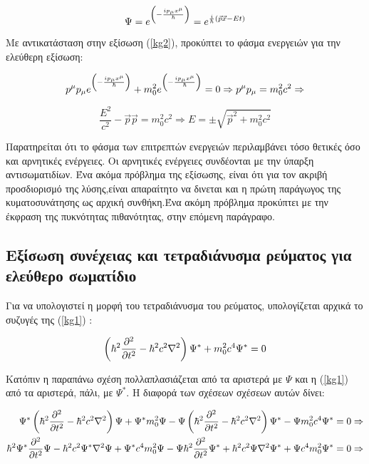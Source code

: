 \begin{equation}
  \Psi = e^{\left(  -\frac{ip_{\mu}x^{\mu}}{\hbar} \right)  } =e^{ \frac{i}{\hbar}\left(  \vec{p}\vec{x} -Et \right)  }
  \label{sol1}
\end{equation}

Με αντικατάσταση στην εξίσωση (\ref{kg2}), προκύπτει το φάσμα ενεργειών για την ελεύθερη εξίσωση:

\[
  {p}^\mu {p}_\mu e^{\left(  -\frac{ip_{\mu}x^{\mu}}{\hbar} \right)  } +m_0^2 e^{\left(  -\frac{ip_{\mu}x^{\mu}}{\hbar} \right)  } = 0 \Rightarrow {p}^\mu {p}_\mu = m_0^2 c^2 \Rightarrow
\]

\[
\frac{E^2}{c^2}- \vec{p}\vec{p}=m_0^2c^2 \Rightarrow E=\pm \sqrt{\vec{p}^2 + m_0^2c^2} 
\]

Παρατηρείται ότι το φάσμα των επιτρεπτών ενεργειών περιλαμβάνει τόσο θετικές όσο και αρνητικές ενέργειες. Οι αρνητικές ενέργειες συνδέονται με την ύπαρξη αντισωματιδίων. Ένα ακόμα πρόβλημα της εξίσωσης, είναι ότι για τον ακριβή προσδιορισμό της λύσης,είναι απαραίτητο να δινεται και η πρώτη παράγωγος της κυματοσυνάτησης ως αρχική συνθήκη.Ένα ακόμη πρόβλημα προκύπτει με την έκφραση της πυκνότητας πιθανότητας, στην επόμενη παράγραφο.
\subsection{Εξίσωση συνέχειας και τετραδιάνυσμα ρεύματος για ελεύθερο σωματίδιο}  

Για να υπολογιστεί η μορφή του τετραδιάνυσμα του ρεύματος, υπολογίζεται αρχικά το συζυγές της (\ref{kg1}) :

\[
\left(  \hbar^2 \frac{\partial ^2}{\partial t^2}- \hbar^2 c^2 \nabla^2 \right)  \Psi^* +m_0^2 c^4 \Psi^* = 0
\]

Κατόπιν η παραπάνω σχέση πολλαπλασιάζεται από τα αριστερά με $\Psi$ και η (\ref{kg1}) από τα αριστερά, πάλι, με $\Psi^*$. Η διαφορά των σχέσεων σχέσεων αυτών δίνει: 

\begin{align*}
  \Psi^* \left(   \hbar^2 \frac{\partial ^2}{\partial t^2}- \hbar^2 c^2 \nabla^2 \right)  \Psi +\Psi^* m_0^2 \Psi - \Psi \left(  \hbar^2\frac{\partial ^2}{\partial t^2}- \hbar^2 c^2 \nabla^2 \right)  \Psi^* -\Psi m_0^2 c^4 \Psi^* &= 0 \Rightarrow
  \\ \hbar^2\Psi^* \frac{\partial ^2}{\partial t^2} \Psi - \hbar^2 c^2\Psi^* \nabla^2\Psi +\Psi^* c^4 m_0^2 \Psi - \Psi \hbar^2\frac{\partial ^2}{\partial t^2}\Psi^* + \hbar^2 c^2 \Psi \nabla^2 \Psi^* + \Psi c^4  m_0^2 \Psi^* &= 0 \Rightarrow
\end{align*}

